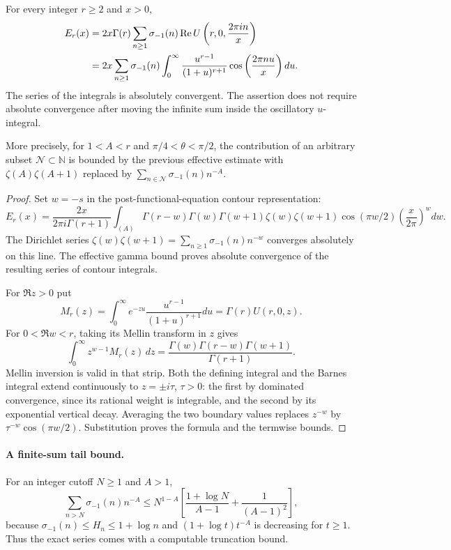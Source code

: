 \begin{theorem}\label{hergjet:thm:herglotz-sectors}
For every integer $r\ge2$ and $x>0$,
\begin{align*}
 E_r(x)
 &=2x\Gamma(r)\sum_{n\ge1}\sigma_{-1}(n)
       \operatorname{Re} U\left(r,0,\frac{2\pi i n}{x}\right)\\
 &=2x\sum_{n\ge1}\sigma_{-1}(n)
   \int_0^\infty\frac{u^{r-1}}{(1+u)^{r+1}}
        \cos\left(\frac{2\pi n u}{x}\right)du.
\end{align*}
The series of the integrals is absolutely convergent. The assertion does
not require absolute convergence after moving the infinite sum inside
the oscillatory $u$-integral.

More precisely, for $1<A<r$ and $\pi/4<\theta<\pi/2$, the contribution
of an arbitrary subset $\mathcal N\subset\mathbb N$ is bounded by the
previous effective estimate with $\zeta(A)\zeta(A+1)$ replaced by
$\sum_{n\in\mathcal N}\sigma_{-1}(n)n^{-A}$.
\end{theorem}

\begin{proof}
Set $w=-s$ in the post-functional-equation contour representation:
\[
 E_r(x)=\frac{2x}{2\pi i\Gamma(r+1)}
 \int_{(A)}\Gamma(r-w)\Gamma(w)\Gamma(w+1)
 \zeta(w)\zeta(w+1)\cos(\pi w/2)
 \left(\frac{x}{2\pi}\right)^w dw.
\]
The Dirichlet series
$\zeta(w)\zeta(w+1)=\sum_{n\ge1}\sigma_{-1}(n)n^{-w}$
converges absolutely on this line. The effective gamma bound proves
absolute convergence of the resulting series of contour integrals.

For $\Re z>0$ put
\[
 M_r(z)=\int_0^\infty e^{-zu}
        \frac{u^{r-1}}{(1+u)^{r+1}}du=\Gamma(r)U(r,0,z).
\]
For $0<\Re w<r$, taking its Mellin transform in $z$ gives
\[
 \int_0^\infty z^{w-1}M_r(z)\,dz
 =\frac{\Gamma(w)\Gamma(r-w)\Gamma(w+1)}{\Gamma(r+1)}.
\]
Mellin inversion is valid in that strip. Both the defining integral
and the Barnes integral extend continuously to $z=\pm i\tau$, $\tau>0$:
the first by dominated convergence, since its rational weight is
integrable, and the second by its exponential vertical decay. Averaging
the two boundary values replaces $z^{-w}$ by
$\tau^{-w}\cos(\pi w/2)$. Substitution proves the formula and the
termwise bounds.
\end{proof}

\paragraph{A finite-sum tail bound.}
For an integer cutoff $N\ge1$ and $A>1$,
\[
 \sum_{n>N}\sigma_{-1}(n)n^{-A}
 \le N^{1-A}\left[\frac{1+\log N}{A-1}
                       +\frac1{(A-1)^2}\right],
\]
because $\sigma_{-1}(n)\le H_n\le1+\log n$ and
$(1+\log t)t^{-A}$ is decreasing for $t\ge1$.
Thus the exact series comes with a computable truncation bound.

